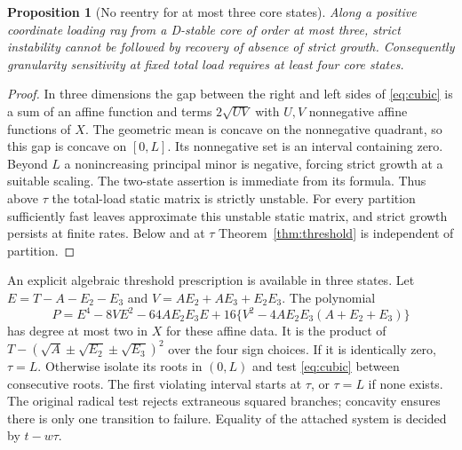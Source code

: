 \documentclass[11pt]{article}
\newtheorem{proposition}[theorem]{Proposition}
\theoremstyle{remark}\newtheorem{remark}[theorem]{Remark}
\begin{document}
\begin{proposition}[No reentry for at most three core states]\label{prop:small}
Along a positive coordinate loading ray from a D-stable core of order
at most three, strict instability cannot be followed by recovery of
absence of strict growth. Consequently granularity sensitivity at fixed
total load requires at least four core states.
\end{proposition}
\begin{proof}
In three dimensions the gap between the right and left sides of
\eqref{eq:cubic} is a sum of an affine function and terms
$2\sqrt{UV}$ with $U,V$ nonnegative affine functions of $X$.
The geometric mean is concave on the nonnegative quadrant, so this gap
is concave on $[0,L]$. Its nonnegative set is an interval containing zero.
Beyond $L$ a nonincreasing principal minor is negative, forcing strict
growth at a suitable scaling. The two-state assertion is immediate from
its formula. Thus above $\tau$ the total-load static matrix is strictly
unstable. For every partition sufficiently fast leaves approximate this
unstable static matrix, and strict growth persists at finite rates.
Below and at $\tau$ Theorem~\ref{thm:threshold} is independent of partition.
\end{proof}

An explicit algebraic threshold prescription is available in three states.
Let $E=T-A-E_2-E_3$ and $V=AE_2+AE_3+E_2E_3$. The polynomial
\[
 P=E^4-8VE^2-64AE_2E_3E+
       16\{V^2-4AE_2E_3(A+E_2+E_3)\}
\]
has degree at most two in $X$ for these affine data. It is the product of
$T-(\sqrt A\pm\sqrt{E_2}\pm\sqrt{E_3})^2$ over the four sign choices.
If it is identically zero, $\tau=L$. Otherwise isolate its roots in
$(0,L)$ and test \eqref{eq:cubic} between consecutive roots. The first
violating interval starts at $\tau$, or $\tau=L$ if none exists.
The original radical test rejects extraneous squared branches; concavity
ensures there is only one transition to failure. Equality of the attached
system is decided by $t-w\tau$.
\end{document}
